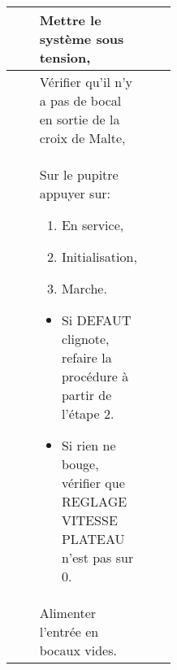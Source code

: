 

\begin{tabular}{|Ep{0.4\linewidth}|p{.5\linewidth}|}
\hline
& Mettre le système sous tension,
&\tabularnewline\hline
 & Vérifier qu'il n'y a pas de bocal en sortie de la croix de Malte,
&\tabularnewline\hline
& Sur le pupitre appuyer sur:
\begin{enumerate}
 \item En service,
 \item Initialisation,
 \item Marche.
\end{enumerate}
\begin{itemize}
 \item Si DEFAUT clignote, refaire la procédure à partir de l'étape 2.
 \item Si rien ne bouge, vérifier que REGLAGE VITESSE PLATEAU n'est pas sur 0.
\end{itemize}
&\tabularnewline\hline
& Alimenter l'entrée en bocaux vides.
&\tabularnewline\hline
\end{tabular}


